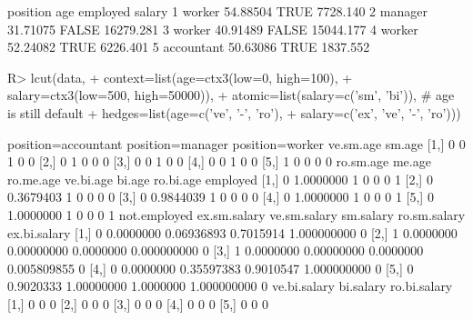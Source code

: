 \begin{Schunk}
% --begin: "lcut.data.frame2"
\begin{Soutput}
    position      age employed    salary
1     worker 54.88504     TRUE  7728.140
2    manager 31.71075    FALSE 16279.281
3     worker 40.91489    FALSE 15044.177
4     worker 52.24082     TRUE  6226.401
5 accountant 50.63086     TRUE  1837.552
\end{Soutput}
\begin{Sinput}
R> lcut(data,
+       context=list(age=ctx3(low=0, high=100),
+                    salary=ctx3(low=500, high=50000)),
+       atomic=list(salary=c('sm', 'bi')), # age is still default
+       hedges=list(age=c('ve', '-', 'ro'),
+                   salary=c('ex', 've', '-', 'ro')))
\end{Sinput}
\begin{Soutput}
     position=accountant position=manager position=worker ve.sm.age sm.age
[1,]                   0                0               1         0      0
[2,]                   0                1               0         0      0
[3,]                   0                0               1         0      0
[4,]                   0                0               1         0      0
[5,]                   1                0               0         0      0
     ro.sm.age    me.age ro.me.age ve.bi.age bi.age ro.bi.age employed
[1,]         0 1.0000000         1         0      0         0        1
[2,]         0 0.3679403         1         0      0         0        0
[3,]         0 0.9844039         1         0      0         0        0
[4,]         0 1.0000000         1         0      0         0        1
[5,]         0 1.0000000         1         0      0         0        1
     not.employed ex.sm.salary ve.sm.salary sm.salary ro.sm.salary ex.bi.salary
[1,]            0    0.0000000   0.06936893 0.7015914  1.000000000            0
[2,]            1    0.0000000   0.00000000 0.0000000  0.000000000            0
[3,]            1    0.0000000   0.00000000 0.0000000  0.005809855            0
[4,]            0    0.0000000   0.35597383 0.9010547  1.000000000            0
[5,]            0    0.9020333   1.00000000 1.0000000  1.000000000            0
     ve.bi.salary bi.salary ro.bi.salary
[1,]            0         0            0
[2,]            0         0            0
[3,]            0         0            0
[4,]            0         0            0
[5,]            0         0            0
\end{Soutput}
%
% --end: "lcut.data.frame2"
\end{Schunk}
